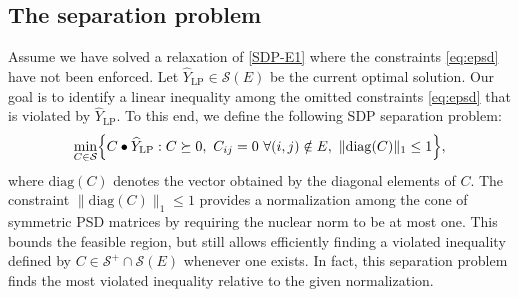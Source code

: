\documentclass[twoside]{article}
\newcommand{\oo}[1]{{\textcolor{blue}{#1}}}
\newcommand{\ooc}[1]{{ \oo{[OG comment: #1}]}}
\newcommand{\jim}[1]{{ \oo{[Jim comment: #1}]}}
\newcommand{\matip}[2]{#1 \bullet #2}
\begin{document}
	
	\subsection{The separation problem}
	
	Assume we have solved a relaxation of \eqref{SDP-E1} where the constraints \eqref{eq:epsd} have not been enforced. Let $\widehat{Y}_{\mathrm{LP}} \in \mathcal S(E)$ be the current optimal solution. 
	Our goal is to identify a linear inequality among the omitted constraints \eqref{eq:epsd} that is violated by $\widehat{Y}_{\mathrm{LP}}$. To this end, we define the following SDP separation problem:
	\begin{equation}
		\label{eq:sdpsep}
		\min_{{C\in \mathcal S}} \Bigl\{ \matip{C}{\widehat{Y}_{\mathrm{LP}}}  : C \succeq 0, \ C_{ij} = 0 \ \forall(i,j) \notin E, \ \| \mathrm{diag}(C)\|_1 \leq 1 \Bigr\},
	\end{equation}
	where $\mathrm{diag}(C)$ denotes the vector obtained by the diagonal elements of $C$.
	The constraint $\| \mathrm{diag}(C)\|_1 \leq 1$ provides a normalization among the cone of symmetric PSD matrices by requiring the nuclear norm to be at most one. This bounds the feasible region, but still allows efficiently finding a violated inequality defined by $C \in \mathcal{S}^+ \cap \mathcal{S}(E)$ whenever one exists. In fact, this separation problem finds the most violated inequality relative to the given normalization.
	
\end{document}
